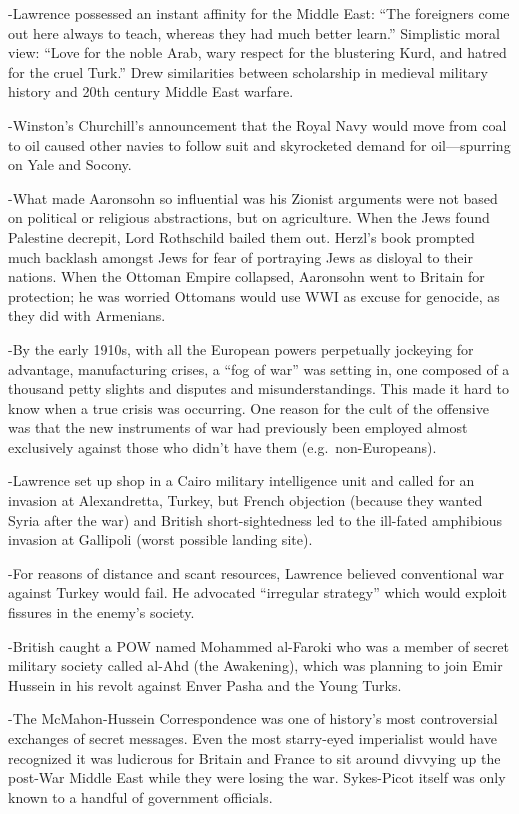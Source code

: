 \documentclass[
]{article}
\begin{document}
-Lawrence possessed an instant affinity for the Middle East: ``The
foreigners come out here always to teach, whereas they had much better
learn.'' Simplistic moral view: ``Love for the noble Arab, wary respect
for the blustering Kurd, and hatred for the cruel Turk.'' Drew
similarities between scholarship in medieval military history and 20th
century Middle East warfare.

-Winston's Churchill's announcement that the Royal Navy would move from
coal to oil caused other navies to follow suit and skyrocketed demand
for oil---spurring on Yale and Socony.

-What made Aaronsohn so influential was his Zionist arguments were not
based on political or religious abstractions, but on agriculture. When
the Jews found Palestine decrepit, Lord Rothschild bailed them out.
Herzl's book prompted much backlash amongst Jews for fear of portraying
Jews as disloyal to their nations. When the Ottoman Empire collapsed,
Aaronsohn went to Britain for protection; he was worried Ottomans would
use WWI as excuse for genocide, as they did with Armenians.

-By the early 1910s, with all the European powers perpetually jockeying
for advantage, manufacturing crises, a ``fog of war'' was setting in,
one composed of a thousand petty slights and disputes and
misunderstandings. This made it hard to know when a true crisis was
occurring. One reason for the cult of the offensive was that the new
instruments of war had previously been employed almost exclusively
against those who didn't have them (e.g.~non-Europeans).

-Lawrence set up shop in a Cairo military intelligence unit and called
for an invasion at Alexandretta, Turkey, but French objection (because
they wanted Syria after the war) and British short-sightedness led to
the ill-fated amphibious invasion at Gallipoli (worst possible landing
site).

-For reasons of distance and scant resources, Lawrence believed
conventional war against Turkey would fail. He advocated ``irregular
strategy'' which would exploit fissures in the enemy's society.

-British caught a POW named Mohammed al-Faroki who was a member of
secret military society called al-Ahd (the Awakening), which was
planning to join Emir Hussein in his revolt against Enver Pasha and the
Young Turks.

-The McMahon-Hussein Correspondence was one of history's most
controversial exchanges of secret messages. Even the most starry-eyed
imperialist would have recognized it was ludicrous for Britain and
France to sit around divvying up the post-War Middle East while they
were losing the war. Sykes-Picot itself was only known to a handful of
government officials.
\end{document}

